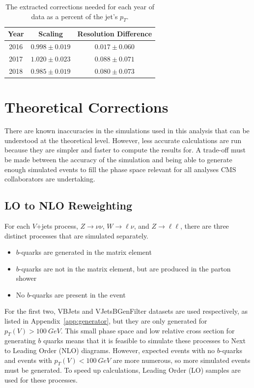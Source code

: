 \begin{table}
  \centering
  \caption[$b$-jet energy correction parameters]{
    The extracted corrections needed for each year of data as a percent of the jet's $p_T$.
  }
  \begin{tabular}{c|c|c}
    \hline
    Year & Scaling & Resolution Difference \\
    \hline
    2016 & $0.998 \pm 0.019$ & $0.017 \pm 0.060$ \\
    2017 & $1.020 \pm 0.023$ & $0.088 \pm 0.071$ \\
    2018 & $0.985 \pm 0.019$ & $0.080 \pm 0.073$ \\
    \hline
  \end{tabular}
  \label{tab:jetsmear-res}
\end{table}

\section{Theoretical Corrections}

There are known inaccuracies in the simulations used in this analysis
that can be understood at the theoretical level.
However, less accurate calculations are run because they are simpler
and faster to compute the results for.
A trade-off must be made between the accuracy of the simulation
and being able to generate enough simulated events to fill the phase space
relevant for all analyses CMS collaborators are undertaking.

\subsection{LO to NLO Reweighting}

For each $V$+jets process, $Z\rightarrow\nu\nu$, $W\rightarrow\ell\nu$,
and $Z\rightarrow\ell\ell$, there are three distinct processes that are simulated separately.
\begin{itemize}
\item $b$-quarks are generated in the matrix element
\item $b$-quarks are not in the matrix element, but are produced in the parton shower
\item No $b$-quarks are present in the event
\end{itemize}
For the first two, VBJets and VJetsBGenFilter datasets are used respectively,
as listed in Appendix~\ref{app:generator},
but they are only generated for $p_T(V) > \SI{100}{GeV}$.
This small phase space and low relative cross section for generating $b$ quarks
means that it is feasible to simulate these processes to Next to Leading Order (NLO) diagrams.
However, expected events with no $b$-quarks and events with $p_T(V) < \SI{100}{GeV}$
are more numerous, so more simulated events must be generated.
To speed up calculations, Leading Order (LO) samples are used for these processes.

